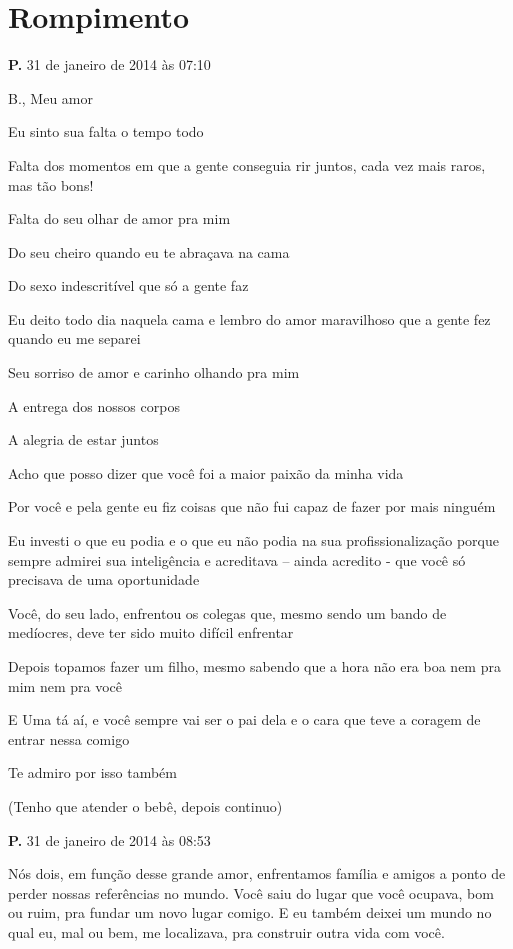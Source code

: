 \chapter{Rompimento}

{\parindent0pt\parskip1pt\raggedright

\textbf{P.} 31 de janeiro de 2014 às 07:10

B., Meu amor

Eu sinto sua falta o tempo todo

Falta dos momentos em que a gente conseguia rir juntos, cada vez mais
raros, mas tão bons!

Falta do seu olhar de amor pra mim

Do seu cheiro quando eu te abraçava na cama

Do sexo indescritível que só a gente faz

Eu deito todo dia naquela cama e lembro do amor maravilhoso que a gente
fez quando eu me separei

Seu sorriso de amor e carinho olhando pra mim

A entrega dos nossos corpos

A alegria de estar juntos

Acho que posso dizer que você foi a maior paixão da minha vida

Por você e pela gente eu fiz coisas que não fui capaz de fazer por mais
ninguém

Eu investi o que eu podia e o que eu não podia na sua profissionalização
porque sempre admirei sua inteligência e acreditava -- ainda acredito -
que você só precisava de uma oportunidade

Você, do seu lado, enfrentou os colegas que, mesmo sendo um bando de
medíocres, deve ter sido muito difícil enfrentar

Depois topamos fazer um filho, mesmo sabendo que a hora não era boa nem
pra mim nem pra você

E Uma tá aí, e você sempre vai ser o pai dela e o cara que teve a
coragem de entrar nessa comigo

Te admiro por isso também

(Tenho que atender o bebê, depois continuo)

\textbf{P.} 31 de janeiro de 2014 às 08:53

Nós dois, em função desse grande amor, enfrentamos família e amigos a
ponto de perder nossas referências no mundo. Você saiu do lugar que você
ocupava, bom ou ruim, pra fundar um novo lugar comigo. E eu também
deixei um mundo no qual eu, mal ou bem, me localizava, pra construir
outra vida com você.

}
